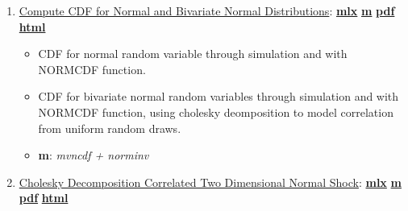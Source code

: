 \documentclass[
]{book}
\providecommand{\tightlist}{%
  \setlength{\itemsep}{0pt}\setlength{\parskip}{0pt}}
\begin{document}
\begin{enumerate}
\def\labelenumi{\arabic{enumi}.}
\tightlist
\item
  \href{https://fanwangecon.github.io/M4Econ/simulation/normal/htmlpdfm/fs_bivariate_normal.html}{Compute CDF for Normal and Bivariate Normal Distributions}: \href{https://github.com/FanWangEcon/M4Econ/blob/master/simulation/normal/fs_bivariate_normal.mlx}{\textbf{mlx}} \textbar{} \href{https://github.com/FanWangEcon/M4Econ/blob/master/simulation/normal/htmlpdfm/fs_bivariate_normal.m}{\textbf{m}} \textbar{} \href{https://github.com/FanWangEcon/M4Econ/blob/master/simulation/normal/htmlpdfm/fs_bivariate_normal.pdf}{\textbf{pdf}} \textbar{} \href{https://fanwangecon.github.io/M4Econ/simulation/normal/htmlpdfm/fs_bivariate_normal.html}{\textbf{html}}

  \begin{itemize}
  \tightlist
  \item
    CDF for normal random variable through simulation and with NORMCDF function.
  \item
    CDF for bivariate normal random variables through simulation and with NORMCDF function, using cholesky deomposition to model correlation from uniform random draws.
  \item
    \textbf{m}: \emph{mvncdf + norminv}
  \end{itemize}
\item
  \href{https://fanwangecon.github.io/M4Econ/simulation/normal/htmlpdfm/fs_cholesky_decomposition.html}{Cholesky Decomposition Correlated Two Dimensional Normal Shock}: \href{https://github.com/FanWangEcon/M4Econ/blob/master/simulation/normal/fs_cholesky_decomposition.mlx}{\textbf{mlx}} \textbar{} \href{https://github.com/FanWangEcon/M4Econ/blob/master/simulation/normal/htmlpdfm/fs_cholesky_decomposition.m}{\textbf{m}} \textbar{} \href{https://github.com/FanWangEcon/M4Econ/blob/master/simulation/normal/htmlpdfm/fs_cholesky_decomposition.pdf}{\textbf{pdf}} \textbar{} \href{https://fanwangecon.github.io/M4Econ/simulation/normal/htmlpdfm/fs_cholesky_decomposition.html}{\textbf{html}}


\end{enumerate}
\end{document}
